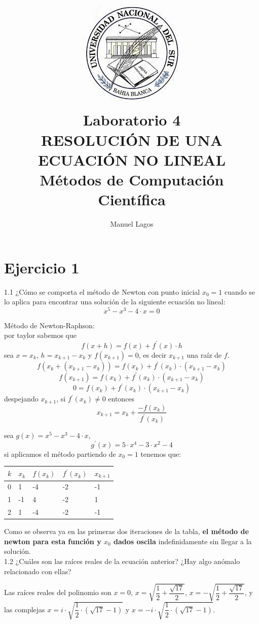\documentclass{article}
\title{\includegraphics[scale=0.5]{logo.jpg}\\ \textbf{Laboratorio 4} 
\\ \large RESOLUCIÓN DE UNA ECUACIÓN NO LINEAL           
\\ \large Métodos de Computación Científica}
\author{Manuel Lagos}
\begin{document}
\setcounter{section}{0}
\maketitle

\section{Ejercicio 1}
1.1 ¿Cómo se comporta el método de Newton con punto inicial $x_0 = 1$ cuando se lo aplica
para encontrar una solución de la siguiente ecuación no lineal:
\[x^5-x^3-4 \cdot x=0\]

Método de Newton-Raphson:
\vspace{0.5cm}\\
por taylor sabemos que
\[f(x+h) = f(x) + f^{'}(x) \cdot h\]
sea $x = x_k$, $h = x_{k+1} - x_k$ y $f(x_{k+1}) = 0$, es decir $x_{k+1}$ una raíz de $f$.
\[f(x_k + (x_{k+1}-x_k)) = f(x_k) + f^{'}(x_k) \cdot (x_{k+1}-x_k)\]
\[f(x_{k+1}) = f(x_k) + f^{'}(x_k) \cdot (x_{k+1}-x_k)\]
\[0 = f(x_k) + f^{'}(x_k) \cdot (x_{k+1}-x_k)\]
despejando $x_{k+1}$, si $f^{'}(x_k) \ne 0$ entonces
\[x_{k+1}=x_k + \dfrac{-f(x_k)}{f^{'}(x_k)}\]

sea $g(x) = x^5-x^3-4 \cdot x$,\\
\[
g^{'}(x) = 5\cdot x^4 -3 \cdot x^2 - 4
\]
si aplicamos el método partiendo de $x_0=1$ tenemos que:

\begin{table}[H]
\centering
\begin{tabular}{|l|l|l|l|l|}
\hline
$k$ & $x_k$ & $f(x_k)$ & $f^{'}(x_k)$ & $x_{k+1}$ \\ \hline
0 & 1    & -4      & -2                             & -1     \\ \hline
1 & -1   & 4       & -2                             & 1      \\ \hline
2 & 1    & -4      & -2                             & -1     \\ \hline
\end{tabular}
\end{table}

Como se observa ya en las primeras dos iteraciones de la tabla, \textbf{el método de newton para esta función y $x_0$ dados oscila} indefinidamente sin llegar a la solución.\\

1.2 ¿Cuáles son las raíces reales de la ecuación anterior? ¿Hay algo anómalo relacionado con
ellas?

Las raíces reales del polinomio son $x=0$, $x=\sqrt{\dfrac{1}{2}+\dfrac{\sqrt{17}}{2}}$, $x=-\sqrt{\dfrac{1}{2}+\dfrac{\sqrt{17}}{2}}$, y las complejas $x=i \cdot \sqrt{\dfrac{1}{2} \cdot (\sqrt{17} - 1)}$ y $x=-i \cdot \sqrt{\dfrac{1}{2} \cdot (\sqrt{17} - 1)}$.
\end{document}
